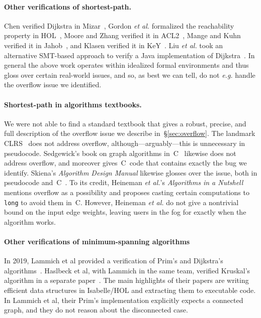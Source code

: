 \paragraph{Other verifications of shortest-path.}
Chen verified Dijkstra in Mizar~\cite{chen2003dijkstra}, Gordon \emph{et al.} formalized the reachability property in HOL~\cite{gordon2003executing}, Moore and Zhang verified it in ACL2~\cite{Moore2005}, Mange and Kuhn verified it in Jahob~\cite{mange2007verifying}, and Klasen verified it in KeY~\cite{klasen2010verifying}.  Liu \emph{et al.} took an alternative SMT-based approach to verify a Java implementation of Dijkstra~\cite{6200101}.  In general the above work operates within
idealized formal environments and thus gloss over certain real-world issues, and so, as best we
can tell, do not \emph{e.g.} handle the overflow issue we identified.



\paragraph{Shortest-path in algorithms textbooks.}
We were not able to find a standard textbook that gives a robust, precise,
and full description of the overflow issue we describe in~\S\ref{sec:overflow}.
The landmark CLRS~\cite{clrs} does not address overflow, although---arguably---this is unnecessary in pseudocode.  Sedgewick's book on graph algorithms in~C~\cite{robert2002algorithms} likewise does not address overflow, and moreover gives~C~code
that contains exactly the bug we identify.  Skiena's \emph{Algorithm Design Manual} likewise
glosses over the issue, both
in pseudocode and~C~\cite{DBLP:books/daglib/0022194}.
To its credit, Heineman \emph{et al.}'s \emph{Algorithms in a Nutshell}~\cite{heineman2008algorithms} mentions overflow as a possibility and
proposes casting certain computations to \texttt{long} to avoid them in~C.  However, Heineman
\emph{et al.} do not give a
nontrivial bound on the input edge weights, leaving users in the fog for exactly when the algorithm works.

\paragraph{Other verifications of minimum-spanning algorithms}In 2019, Lammich et al provided a verification of Prim's and Dijkstra's algorithms~\cite{DBLP:journals/afp/LammichN19}. Haslbeck et al, with Lammich in the same team, verified Kruskal's algorithm in a separate paper~\cite{DBLP:journals/afp/HaslbeckLB19}. The main highlights of their papers are writing efficient data structures in Isabelle/HOL and extracting them to executable code. In Lammich et al, their Prim's implementation explicitly expects a connected graph, and they do not reason about the disconnected case.

